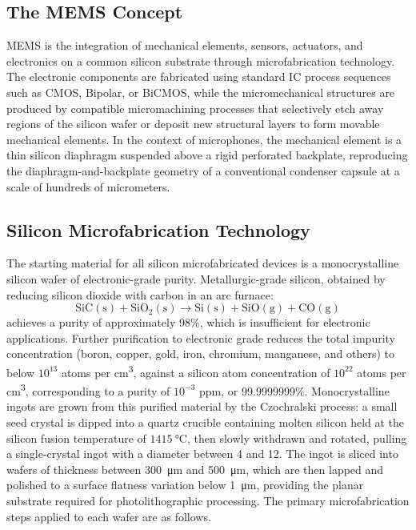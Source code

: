 \subsection{The MEMS Concept}

MEMS is the integration of mechanical elements, sensors, actuators, and electronics on a common silicon substrate through microfabrication technology.
The electronic components are fabricated using standard IC process sequences such as CMOS, Bipolar, or BiCMOS, while the micromechanical structures are produced by compatible micromachining processes that selectively etch away regions of the silicon wafer or deposit new structural layers to form movable mechanical elements.
In the context of microphones, the mechanical element is a thin silicon diaphragm suspended above a rigid perforated backplate, reproducing the diaphragm-and-backplate geometry of a conventional condenser capsule at a scale of hundreds of micrometers.

\subsection{Silicon Microfabrication Technology}

The starting material for all silicon microfabricated devices is a monocrystalline silicon wafer of electronic-grade purity.
Metallurgic-grade silicon, obtained by reducing silicon dioxide with carbon in an arc furnace:
\[
\mathrm{SiC(s)} + \mathrm{SiO_2(s)} \longrightarrow \mathrm{Si(s)} + \mathrm{SiO(g)} + \mathrm{CO(g)}
\]
achieves a purity of approximately 98\%, which is insufficient for electronic applications.
Further purification to electronic grade reduces the total impurity concentration (boron, copper, gold, iron, chromium, manganese, and others) to below \( 10^{13} \) atoms per \si{\centi\meter\cubed}, against a silicon atom concentration of \( 10^{22} \) atoms per \si{\centi\meter\cubed}, corresponding to a purity of \( 10^{-3} \) ppm, or 99.9999999\%.
Monocrystalline ingots are grown from this purified material by the Czochralski process: a small seed crystal is dipped into a quartz crucible containing molten silicon held at the silicon fusion temperature of \( \SI{1415}{\degreeCelsius} \), then slowly withdrawn and rotated, pulling a single-crystal ingot with a diameter between \SI{4}{\inch} and \SI{12}{\inch}.
The ingot is sliced into wafers of thickness between \SI{300}{\micro\meter} and \SI{500}{\micro\meter}, which are then lapped and polished to a surface flatness variation below \SI{1}{\micro\meter}, providing the planar substrate required for photolithographic processing.
The primary microfabrication steps applied to each wafer are as follows.

